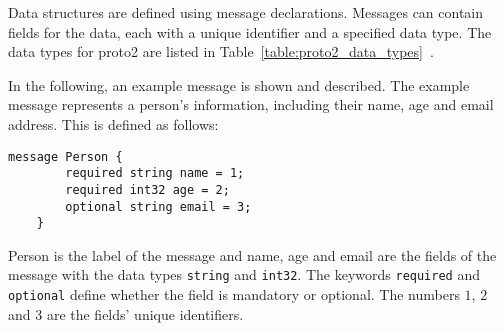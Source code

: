 \documentclass[../MasterThesis.tex]{subfiles}
\begin{document}
\begin{description}[font=\normalfont\color{RedViolet!80!black}, style=nextline]
	

\item[Messages and Fields] 

Data structures are defined using message declarations. Messages can contain fields for the data, each with a unique identifier and a specified data type. The data types for proto2 are listed in Table~\ref{table:proto2_data_types}~\cite{proto2_doc}.

In the following, an example message is shown and described.
The example message represents a person's information, including their name, age and email address. This is defined as follows:

\begin{lstlisting}[style=protobufStyle, numbers=none]
	message Person {
		required string name = 1;
		required int32 age = 2;
		optional string email = 3;
	}
\end{lstlisting}

Person is the label of the message and name, age and email are the fields of the message with the data types \texttt{string} and \texttt{int32}.
The keywords \texttt{required} and \texttt{optional} define whether the field is mandatory or optional.
The numbers $1$, $2$ and $3$ are the fields' unique identifiers.



\end{description}
\end{document}
